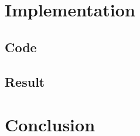\documentclass[11pt]{article}
\begin{document}
\section{Implementation}

\subsection{Code}

\subsection{Result}

\section{Conclusion}




\end{document}

